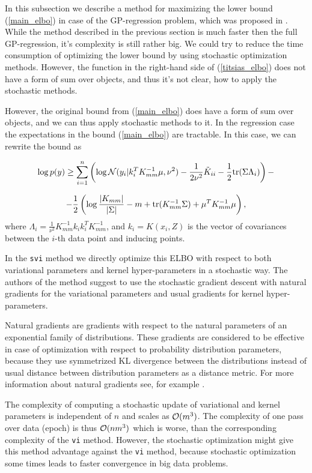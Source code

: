 In this subsection we describe a method for maximizing the lower bound (\ref{main_elbo}) in case of the GP-regression problem, which was proposed in \cite{BigData}. While the method described in the previous section is much faster then the full GP-regression, it's complexity is still rather big. We could try to reduce the time consumption of optimizing the lower bound by using stochastic optimization methods. However, the function in the right-hand side of (\ref{titsias_elbo}) does not have a form of sum over objects, and thus it's not clear, how to apply the stochastic methods.

However, the original bound from (\ref{main_elbo}) does have a form of sum over objects, and we can thus apply stochastic methods to it. In the regression case the expectations in the bound (\ref{main_elbo}) are tractable. In this case, we can rewrite the bound as

$$\log p(y) \ge \sum_{i = 1}^{n} \left( \log \mathcal{N}(y_i | k_i^T K_{mm}^{-1} \mu, \nu^2) - \frac 1 {2 \nu^2} \tilde K_{ii} - \frac 1 2 \mbox{tr} (\Sigma \Lambda_i) \right) - $$

\begin{equation} \label{svi_elbo}
	-\frac 1 2 \left (\log \frac {|K_{mm}|} {|\Sigma|} - m + \mbox{tr}(K_{mm}^{-1} \Sigma) + \mu^T K_{mm}^{-1} \mu \right),
\end{equation}
where $\Lambda_i = \frac 1 {\nu^2} K_{mm}^{-1} k_i k_i^T K_{mm}^{-1}$, and $k_i = K(x_i, Z)$ is the vector of covariances between the $i$-th data point and inducing points.

In the \lstinline{svi} method we directly optimize this ELBO with respect to both variational parameters and kernel hyper-parameters in a stochastic way. The authors of the method suggest to use the stochastic gradient descent with natural gradients for the variational parameters and usual gradients for kernel hyper-parameters.

Natural gradients are gradients with respect to the natural parameters of an exponential family of distributions. These gradients are considered to be effective in case of optimization with respect to probability distribution parameters, because they use symmetrized KL divergence between the distributions instead of usual distance between distribution parameters as a distance metric. For more information about natural gradients see, for example \cite{ExpFamilyGeom}.

The complexity of computing a stochastic update of variational and kernel parameters is independent of $n$ and scales as $\mathcal{O}(m^3)$. The complexity of one pass over data (epoch) is thus $\mathcal{O}(nm^3)$ which is worse, than the corresponding complexity of the \lstinline{vi} method. However, the stochastic optimization might give this method advantage against the \lstinline{vi} method, because stochastic optimization some times leads to faster convergence in big data problems. 

